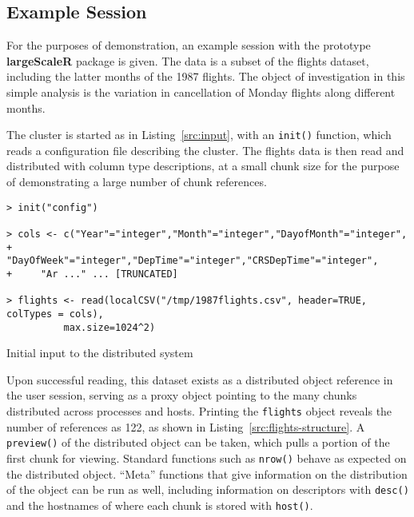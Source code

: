 \subsection{Example Session}

For the purposes of demonstration, an example session with the prototype \textbf{largeScaleR} package is given.
The data is a subset of the flights dataset, including the latter months of the 1987 flights.
The object of investigation in this simple analysis is the variation in cancellation of Monday flights along different months.

The cluster is started as in Listing~\ref{src:input}, with an \texttt{init()} function, which reads a configuration file describing the cluster.
The flights data is then read and distributed with column type descriptions, at a small chunk size for the purpose of demonstrating a large number of chunk references.
\begin{listing}%
\begin{verbatim}
> init("config")

> cols <- c("Year"="integer","Month"="integer","DayofMonth"="integer",
+ 	  "DayOfWeek"="integer","DepTime"="integer","CRSDepTime"="integer",
+ 	  "Ar ..." ... [TRUNCATED]

> flights <- read(localCSV("/tmp/1987flights.csv", header=TRUE, colTypes = cols),
		  max.size=1024^2)
\end{verbatim}
\caption{Initial input to the distributed system}\label{src:input}
\end{listing}

Upon successful reading, this dataset exists as a distributed object reference in the user session, serving as a proxy object pointing to the many chunks distributed across processes and hosts.
Printing the \texttt{flights} object reveals the number of references as 122, as shown in Listing~\ref{src:flights-structure}.
A \texttt{preview()} of the distributed object can be taken, which pulls a portion of the first chunk for viewing.
Standard functions such as \texttt{nrow()} behave as expected on the distributed object.
``Meta'' functions that give information on the distribution of the object can be run as well, including information on descriptors with \texttt{desc()} and the hostnames of where each chunk is stored with \texttt{host()}.

